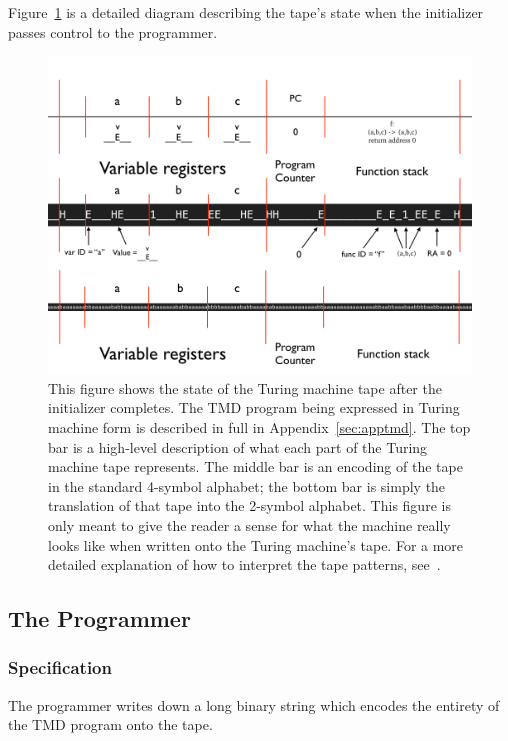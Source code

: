 \documentclass[11pt]{article}
\begin{document}
Figure~\ref{fig:postinit} is a detailed diagram describing the tape's state when the initializer passes control to the programmer. 

\begin{figure} 
\begin{center} 
\includegraphics[scale=0.42]{figs/postinit.png}
\caption{This figure shows the state of the Turing machine tape after the initializer completes. The TMD program being expressed in Turing machine form is described in full in Appendix~\ref{sec:apptmd}. The top bar is a high-level description of what each part of the Turing machine tape represents. The middle bar is an encoding of the tape in the standard 4-symbol alphabet; the bottom bar is simply the translation of that tape into the 2-symbol alphabet. This figure is only meant to give the reader a sense for what the machine really looks like when written onto the Turing machine's tape. For a more detailed explanation of how to interpret the tape patterns, see~\cite{ref:github}. \label{fig:postinit}} 
\end{center} 
\end{figure}

\subsection{The Programmer}

\subsubsection{Specification}

The programmer writes down a long binary string which encodes the entirety of the TMD program onto the tape.
\end{document}
